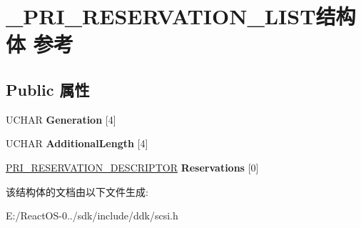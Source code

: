 \hypertarget{struct___p_r_i___r_e_s_e_r_v_a_t_i_o_n___l_i_s_t}{}\section{\+\_\+\+P\+R\+I\+\_\+\+R\+E\+S\+E\+R\+V\+A\+T\+I\+O\+N\+\_\+\+L\+I\+S\+T结构体 参考}
\label{struct___p_r_i___r_e_s_e_r_v_a_t_i_o_n___l_i_s_t}
\subsection*{Public 属性}
\begin{DoxyCompactItemize}
\item 
\mbox{\label{struct___p_r_i___r_e_s_e_r_v_a_t_i_o_n___l_i_s_t_a3883f9bce63fc6e95b05b9ee1711d55d}} 
U\+C\+H\+AR {\bfseries Generation} \mbox{[}4\mbox{]}
\item 
\mbox{\label{struct___p_r_i___r_e_s_e_r_v_a_t_i_o_n___l_i_s_t_a53626f8dc2737c2344ba5c95af26d75a}} 
U\+C\+H\+AR {\bfseries Additional\+Length} \mbox{[}4\mbox{]}
\item 
\mbox{\label{struct___p_r_i___r_e_s_e_r_v_a_t_i_o_n___l_i_s_t_a55c0a36f447ad0eaab0d66109bf25547}} 
\hyperlink{struct___p_r_i___r_e_s_e_r_v_a_t_i_o_n___d_e_s_c_r_i_p_t_o_r}{P\+R\+I\+\_\+\+R\+E\+S\+E\+R\+V\+A\+T\+I\+O\+N\+\_\+\+D\+E\+S\+C\+R\+I\+P\+T\+OR} {\bfseries Reservations} \mbox{[}0\mbox{]}
\end{DoxyCompactItemize}


该结构体的文档由以下文件生成\+:\begin{DoxyCompactItemize}
\item 
E\+:/\+React\+O\+S-\/0../sdk/include/ddk/scsi.\+h\end{DoxyCompactItemize}
